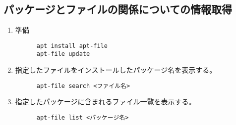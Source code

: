 \documentclass{jreport}
\begin{document}
\subsection{パッケージとファイルの関係についての情報取得}
\begin{enumerate}
  \item 準備
  \begin{screen}
    \begin{verbatim}
      apt install apt-file
      apt-file update
    \end{verbatim}
  \end{screen}
  \item 指定したファイルをインストールしたパッケージ名を表示する。
  \begin{screen}
    \begin{verbatim}
      apt-file search <ファイル名>
    \end{verbatim}
  \end{screen}
  \item 指定したパッケージに含まれるファイル一覧を表示する。
  \begin{screen}
    \begin{verbatim}
      apt-file list <パッケージ名>
    \end{verbatim}
  \end{screen}  
\end{enumerate}
\end{document}
